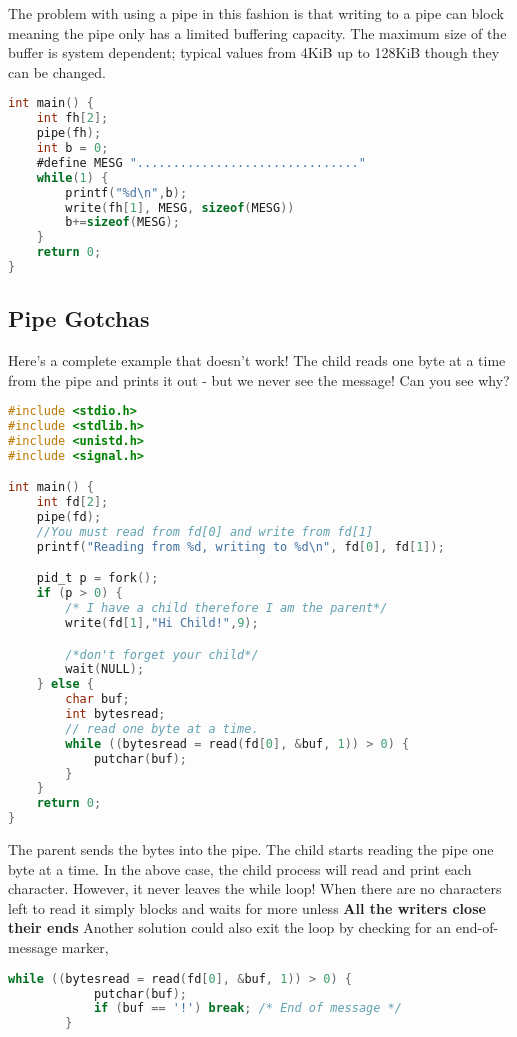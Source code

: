 The problem with using a pipe in this fashion is that writing to a pipe can block meaning the pipe only has a limited buffering capacity.
The maximum size of the buffer is system dependent; typical values from 4KiB up to 128KiB though they can be changed.

\begin{lstlisting}[language=C]
int main() {
    int fh[2];
    pipe(fh);
    int b = 0;
    #define MESG "..............................."
    while(1) {
        printf("%d\n",b);
        write(fh[1], MESG, sizeof(MESG))
        b+=sizeof(MESG);
    }
    return 0;
}
\end{lstlisting}

\subsection{Pipe Gotchas}

Here's a complete example that doesn't work! The child reads one byte at a time from the pipe and prints it out - but we never see the message! Can you see why?

\begin{lstlisting}[language=C]
#include <stdio.h>
#include <stdlib.h>
#include <unistd.h>
#include <signal.h>

int main() {
    int fd[2];
    pipe(fd);
    //You must read from fd[0] and write from fd[1]
    printf("Reading from %d, writing to %d\n", fd[0], fd[1]);

    pid_t p = fork();
    if (p > 0) {
        /* I have a child therefore I am the parent*/
        write(fd[1],"Hi Child!",9);

        /*don't forget your child*/
        wait(NULL);
    } else {
        char buf;
        int bytesread;
        // read one byte at a time.
        while ((bytesread = read(fd[0], &buf, 1)) > 0) {
            putchar(buf);
        }
    }
    return 0;
}
\end{lstlisting}

The parent sends the bytes  into the pipe.
The child starts reading the pipe one byte at a time.
In the above case, the child process will read and print each character.
However, it never leaves the while loop!
When there are no characters left to read it simply blocks and waits for more unless \textbf{All the writers close their ends}
Another solution could also exit the loop by checking for an end-of-message marker,

\begin{lstlisting}[language=C]
        while ((bytesread = read(fd[0], &buf, 1)) > 0) {
            putchar(buf);
            if (buf == '!') break; /* End of message */
        }
\end{lstlisting}


